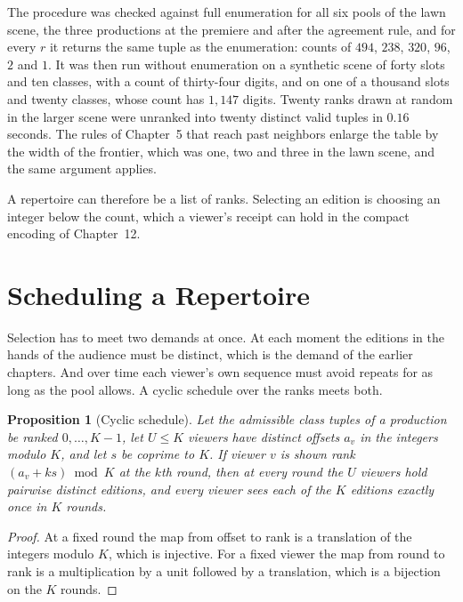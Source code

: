 \documentclass[11pt,twoside,openright]{book}
\theoremstyle{plain}
\newtheorem{proposition}[theorem]{Proposition}
\theoremstyle{definition}
\theoremstyle{remark}
\begin{document}
The procedure was checked against full enumeration for all six pools of the lawn scene, the three productions at the premiere and after the agreement rule, and for every $r$ it returns the same tuple as the enumeration: counts of $494$, $238$, $320$, $96$, $2$ and $1$. It was then run without enumeration on a synthetic scene of forty slots and ten classes, with a count of thirty-four digits, and on one of a thousand slots and twenty classes, whose count has $1{,}147$ digits. Twenty ranks drawn at random in the larger scene were unranked into twenty distinct valid tuples in $0.16$ seconds. The rules of Chapter~5 that reach past neighbors enlarge the table by the width of the frontier, which was one, two and three in the lawn scene, and the same argument applies.

A repertoire can therefore be a list of ranks. Selecting an edition is choosing an integer below the count, which a viewer's receipt can hold in the compact encoding of Chapter~12.

\section{Scheduling a Repertoire}\label{sec:schedule13}

Selection has to meet two demands at once. At each moment the editions in the hands of the audience must be distinct, which is the demand of the earlier chapters. And over time each viewer's own sequence must avoid repeats for as long as the pool allows. A cyclic schedule over the ranks meets both.

\begin{proposition}[Cyclic schedule]\label{prop:cyclic}
Let the admissible class tuples of a production be ranked $0,\dots,K-1$, let $U\le K$ viewers have distinct offsets $a_v$ in the integers modulo $K$, and let $s$ be coprime to $K$. If viewer $v$ is shown rank $(a_v+ks)\bmod K$ at the $k$th round, then at every round the $U$ viewers hold pairwise distinct editions, and every viewer sees each of the $K$ editions exactly once in $K$ rounds.
\end{proposition}

\begin{proof}
At a fixed round the map from offset to rank is a translation of the integers modulo $K$, which is injective. For a fixed viewer the map from round to rank is a multiplication by a unit followed by a translation, which is a bijection on the $K$ rounds.
\end{proof}
\end{document}
